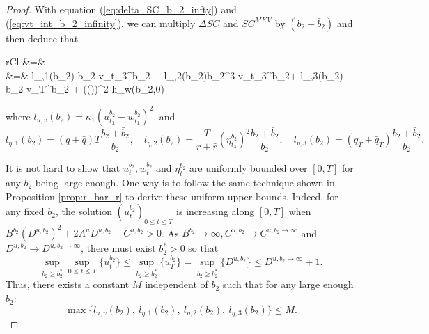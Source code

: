 \documentclass[11pt]{article}
\begin{document}
\begin{proof}
	With equation (\ref{eq:delta_SC_b_2_infty}) and (\ref{eq:vt_int_b_2_infinity}), we can multiply $\Delta SC$ and $SC^{MKV}$ by $(b_2 +\bar{b}_2)$ and then deduce that
	\begin{IEEEeqnarray}{rCl}
		 &=&  \nonumber \\
		&=&  { l_{\eta,1}(b_2) \cdot b_2 v_{t_3}^{b_2}  + l_{\eta,2}(b_2)\cdot b_2^3 v_{t_3}^{b_2}+ l_{\eta,3}(b_2) \cdot b_2 v_T^{b_2} + ((\xi))^2 h_w(b_2,0) }
	\label{eq:delta_SC_SC^MKV_b_2_infinity}
	\end{IEEEeqnarray}
	where 
	$\displaystyle l_{u,v}(b_2) = \kappa_1   \left(u_{t_1}^{b_2}- w_{t_1}^{b_2} \right)^2 $, and
	$$ \displaystyle l_{\eta,1}(b_2) =  (q + \bar{q})T  \frac{b_2 + \bar{b}_2}{b_2},\quad 
	l_{\eta,2}(b_2) = \frac{T}{r+ \bar{r}} (\eta_{t_3}^{b_2})^2 \frac{b_2 + \bar{b}_2}{b_2}, \quad 
	l_{\eta,3}(b_2) = (q_T + \bar{q}_T) \frac{b_2 + \bar{b}_2}{b_2}.$$	

	It is not hard to show that $u_t^{b_2}, w_t^{b_2}$ and $\eta_t^{b_2}$ are uniformly bounded over $[0,T]$ for any $b_2$ being large enough. One way is to follow the same technique shown in Proposition \ref{prop:r_bar_r} to derive these uniform upper bounds. Indeed, for any fixed $b_2$, the solution $(u_t^{b_2})_{0\leq t \leq T}$ is increasing along $[0,T]$ when $B^{b_2} (D^{u,b_2})^2 + 2 A^{u} D^{u,b_2} - C^{u,b_2} > 0$. As $B^{b_2} \to \infty, C^{u,b_2} \to C^{u,b_2 \to \infty}$ and $D^{u,b_2} \to D^{u,b_2\to \infty}$, there must exist $b_2^*> 0 $ so that
	$$\sup_{b_2 \geq b_2^*} \sup_{0 \leq t \leq T} \{ u_t^{b_2}\} \leq \sup_{b_2 \geq b_2^*} \{ u_T^{b_2} \} = \sup_{b_2 \geq b_2^*} \{ D^{u,b_2} \} \leq D^{u,b_2\to \infty} + 1.$$
	Thus, there exists a constant $M$ independent of $b_2$ such that for any large enough $b_2$:
	$$ \max \{ l_{u,v}(b_2), \  l_{\eta,1}(b_2), \  l_{\eta,2}(b_2), \  l_{\eta,3}(b_2) \} \leq M.$$ 
		

	 

\end{proof}
\end{document}
